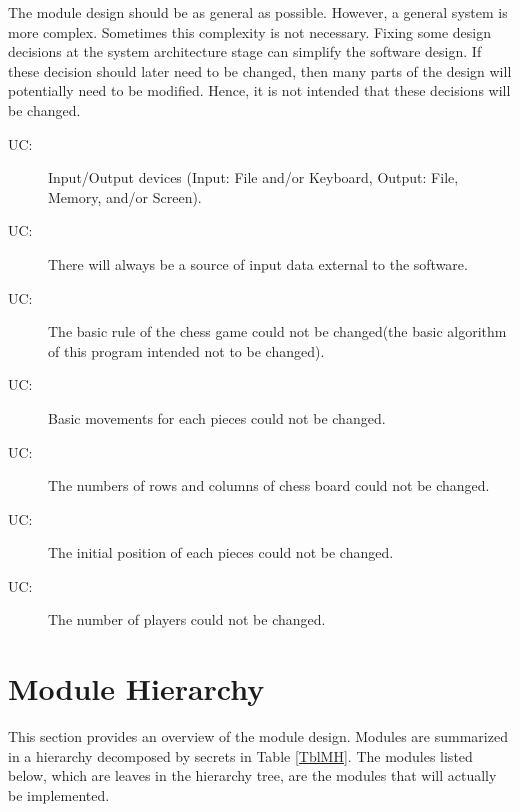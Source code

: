 \documentclass[12pt, titlepage]{article}
\newcounter{ucnum}
\newcommand{\uctheucnum}{UC\theucnum}
\begin{document}
The module design should be as general as possible. However, a general system is
more complex. Sometimes this complexity is not necessary. Fixing some design
decisions at the system architecture stage can simplify the software design. If
these decision should later need to be changed, then many parts of the design
will potentially need to be modified. Hence, it is not intended that these
decisions will be changed.

\begin{description}
\item[ \uctheucnum \label{ucIO}:] Input/Output devices
  (Input: File and/or Keyboard, Output: File, Memory, and/or Screen).
\item[ \uctheucnum \label{ucInput}:] There will always be
  a source of input data external to the software.
\item[ \uctheucnum \label{ucRule}:] The basic rule of the chess game could not be changed(the basic algorithm of this program intended not to be changed). 
\item[ \uctheucnum \label{ucMovment}:] Basic movements for each pieces could not be changed.   
\item[ \uctheucnum \label{ucBoard}:]  The numbers of rows and columns of chess board could not be changed.
\item[ \uctheucnum \label{ucPosition}:]  The initial position of each pieces could not be changed.
\item[ \uctheucnum \label{ucPlayers}:]  The number of players could not be changed.
\end{description}



\section{Module Hierarchy} \label{SecMH}

This section provides an overview of the module design. Modules are summarized
in a hierarchy decomposed by secrets in Table \ref{TblMH}. The modules listed
below, which are leaves in the hierarchy tree, are the modules that will
actually be implemented.
\end{document}
